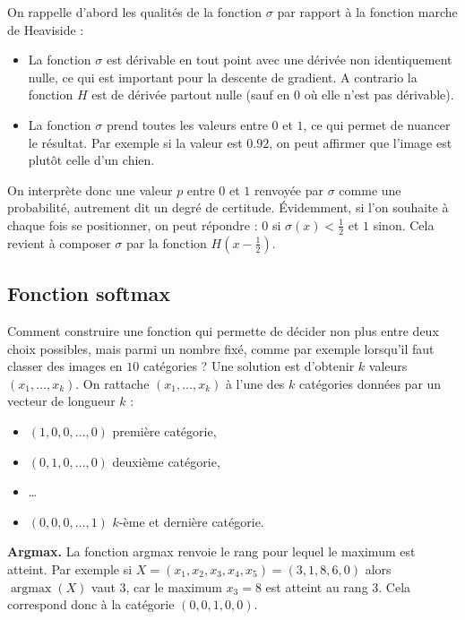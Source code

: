 \documentclass[11pt,class=report,crop=false]{standalone}
\begin{document}
\bigskip




On rappelle d'abord les qualités de la fonction $\sigma$ par rapport à la fonction marche de Heaviside :
\begin{itemize}
  \item La fonction $\sigma$ est dérivable en tout point avec une dérivée non identiquement nulle, ce qui est important pour la descente de gradient. A contrario la fonction $H$ est de dérivée partout nulle (sauf en $0$ où elle n'est pas dérivable).
  
  \item La fonction $\sigma$ prend toutes les valeurs entre $0$ et $1$, ce qui permet de nuancer le résultat. Par exemple si la valeur est $0.92$, on peut affirmer que l'image est plutôt celle d'un chien.
\end{itemize}

On interprète donc une valeur $p$ entre $0$ et $1$ renvoyée par $\sigma$ comme une probabilité, autrement dit un degré de certitude.
Évidemment, si l'on souhaite à chaque fois se positionner, on peut répondre : $0$ si $\sigma(x) < \frac12$ et $1$ sinon.
Cela revient à composer $\sigma$ par la fonction $H(x-\frac12)$. 


\subsection{Fonction softmax}

Comment construire une fonction qui permette de décider non plus entre deux choix possibles, mais parmi un nombre fixé, comme par exemple lorsqu'il faut classer des images en $10$ catégories ?
Une solution est d'obtenir $k$ valeurs $(x_1,\ldots,x_k)$. On rattache $(x_1,\ldots,x_k)$ à l'une des $k$ catégories données par un vecteur de longueur $k$ :
\begin{itemize}
  \item $(1,0,0,\ldots,0)$ première catégorie,
  \item $(0,1,0,\ldots,0)$ deuxième catégorie,
  \item \ldots
  \item $(0,0,0,\ldots,1)$ $k$-ème et dernière catégorie.
\end{itemize}

\textbf{Argmax.}
La fonction argmax renvoie le rang pour lequel le maximum est atteint.
Par exemple si $X = (x_1,x_2,x_3,x_4,x_5) = (3,1,8,6,0)$ alors 
$\operatorname{argmax}(X)$ vaut $3$, car le maximum $x_3 = 8$ est atteint au rang $3$.
Cela correspond donc à la catégorie $(0,0,1,0,0)$.
\end{document}
